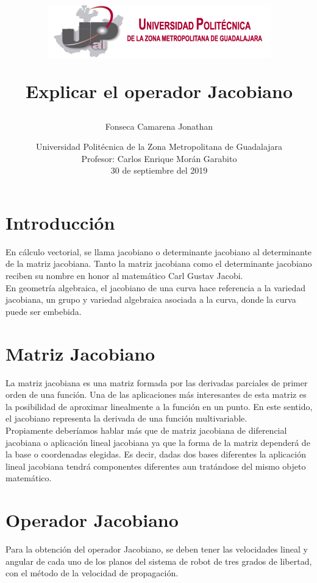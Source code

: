 \documentclass[12pt,a4paper]{report}
\begin{document}
\author{Fonseca Camarena Jonathan}

\title{\begin{center}
\includegraphics[scale=1.5]{Escudo.png} 
\end{center}Explicar el operador Jacobiano}

\date{
Universidad Politécnica de la Zona Metropolitana de Guadalajara\\
Profesor: Carlos Enrique Morán Garabito\\
30 de septiembre del 2019}

\maketitle
\tableofcontents
\section{Introducción}
En cálculo vectorial, se llama jacobiano o determinante jacobiano al determinante de la matriz jacobiana. Tanto la matriz jacobiana como el determinante jacobiano reciben su nombre en honor al matemático Carl Gustav Jacobi.
\noindent\\
En geometría algebraica, el jacobiano de una curva hace referencia a la variedad jacobiana, un grupo y variedad algebraica asociada a la curva, donde la curva puede ser embebida.

\section{Matriz Jacobiano}
La matriz jacobiana es una matriz formada por las derivadas parciales de primer orden de una función. Una de las aplicaciones más interesantes de esta matriz es la posibilidad de aproximar linealmente a la función en un punto. En este sentido, el jacobiano representa la derivada de una función multivariable. 
\noindent\\
Propiamente deberíamos hablar más que de matriz jacobiana de diferencial jacobiana o aplicación lineal jacobiana ya que la forma de la matriz dependerá de la base o coordenadas elegidas. Es decir, dadas dos bases diferentes la aplicación lineal jacobiana tendrá componentes diferentes aun tratándose del mismo objeto matemático. 
\section{Operador Jacobiano}
Para la obtención del operador Jacobiano, se deben tener las velocidades lineal y angular de cada uno de los planos del sistema de robot de tres grados de libertad, con el método de la velocidad de propagación.
\end{document}
